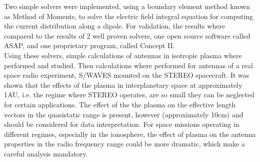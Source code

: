 \documentclass[two-column,ras]{agutex}
\begin{document}
\begin{article}
Two simple solvers were implemented, using a boundary element method known as Method of Moments, to solve the electric field integral equation for computing the current distribution along a dipole. For validation, the results where compared to the results of 2 well proven solvers, one open source software called ASAP, and one proprietary program, called Concept II.\\

Using these solvers, simple calculations of antennas in isotropic plasma where performed and studied. Then calculations where performed for antennas of a real space radio experiment, S/WAVES mounted on the STEREO spacecraft. It was shown that the effects of the plasma in interplanetary space at approximately 1AU, i.e. the regime where STEREO operates, are so small they can be neglected for certain applications. The effect of the the plasma on the effective length vectors in the quasistatic range is present, however (approximately 10cm) and should be considered for data interpretation. For space missions operating in different regimes, especially in the ionosphere, the effect of plasma on the antenna properties in the radio frequency range could be more dramatic, which make a careful analysis mandatory.\\
%
%




%
%
%
%
%
%


\end{article}
\end{document}

